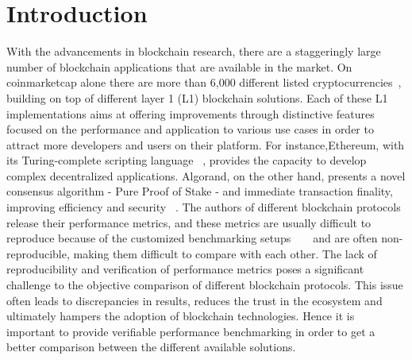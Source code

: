 \chapter{Introduction}
\label{chap:chaptertwo}


With the advancements in blockchain research, there are a staggeringly large number of blockchain applications that are available in the market. On coinmarketcap alone there are more than 6,000 different listed cryptocurrencies~\cite{coinmarketcap}, building on top of different layer 1 (L1) blockchain solutions. Each of these L1 implementations aims at offering improvements through distinctive features focused on the performance and application to various use cases in order to attract more developers and users on their platform. For instance,Ethereum, with its Turing-complete scripting language ~\cite{Buterin}, provides the capacity to develop complex decentralized applications. Algorand, on the other hand, presents a novel consensus algorithm - Pure Proof of Stake - and immediate transaction finality, improving efficiency and security ~\cite{Dimitri_2022}. The authors of different blockchain protocols release their performance metrics, and these metrics are usually difficult to reproduce because of the customized benchmarking setups ~\cite{PolygonWiki} ~\cite{AlgorandPerformance} and are often non-reproducible, making them difficult to compare with each other. The lack of reproducibility and verification of performance metrics poses a significant challenge to the objective comparison of different blockchain protocols. This issue often leads to discrepancies in results, reduces the trust in the ecosystem and ultimately hampers the adoption of blockchain technologies. Hence it is important to provide verifiable performance benchmarking in order to get a better comparison between the different available solutions.


